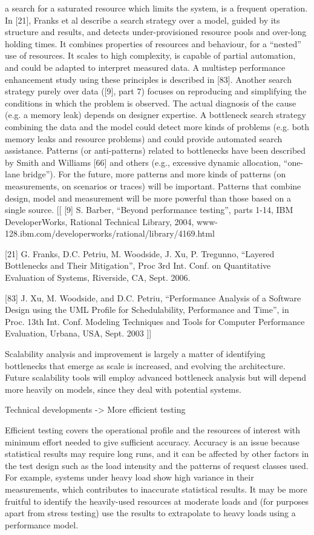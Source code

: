 \documentclass[runningheads,a4paper]{llncs}
\begin{document}
a search for a saturated resource which limits the system, is a frequent
operation. In [21], Franks et al describe a search strategy over a model, guided by its structure and
results, and detects under-provisioned resource pools and over-long holding
times. It combines properties of resources and behaviour, for a “nested” use of
resources. It scales to high complexity, is capable of partial automation, and
could be adapted to interpret measured data. A multistep performance enhancement
study using these principles is described in [83].
Another search strategy purely over data ([9], part 7) focuses on reproducing
and simplifying the conditions in which the problem is observed. The actual diagnosis
of the cause (e.g. a memory leak) depends on designer expertise.
A bottleneck search strategy combining the data and the model could detect more
kinds of problems (e.g. both memory leaks and resource problems) and could
provide automated search assistance.
Patterns (or anti-patterns) related to bottlenecks have been described by Smith
and Williams [66] and others (e.g., excessive dynamic allocation, “one-lane bridge”).
For the future, more patterns and more kinds of patterns (on measurements, on
scenarios or traces) will be important. Patterns that combine design, model and
measurement will be more powerful than those based on a single source.
[[
[9] S. Barber, “Beyond performance testing”, parts 1-14, IBM DeveloperWorks,
Rational Technical Library, 2004, www-128.ibm.com/developerworks/rational/library/4169.html

[21] G. Franks, D.C. Petriu, M. Woodside, J. Xu, P. Tregunno, “Layered
Bottlenecks and Their Mitigation”, Proc 3rd Int. Conf. on Quantitative Evaluation of Systems,
Riverside, CA, Sept. 2006.

[83] J. Xu, M. Woodside, and D.C. Petriu, “Performance Analysis of a Software
Design using the UML Profile for Schedulability, Performance and Time”, in Proc. 13th Int.
Conf. Modeling Techniques and Tools for Computer Performance Evaluation, Urbana,
USA, Sept. 2003 ]]

Scalability analysis and improvement is largely a matter of identifying
bottlenecks that emerge as scale is increased, and evolving the architecture. Future
scalability tools will employ advanced bottleneck analysis but will depend more
heavily on models, since they deal with potential systems.

Technical developments -> More efficient testing

Efficient testing covers the operational profile and the resources of interest
with minimum effort needed to give sufficient accuracy. Accuracy is an issue
because statistical results may require long runs, and it can be affected by
other factors in the test design such as the load intensity and the patterns of request classes
used. For example, systems under heavy load show high variance in their
measurements, which contributes to inaccurate statistical results. It may be more fruitful
to identify the heavily-used resources at moderate loads and (for purposes apart
from stress testing) use the results to extrapolate to heavy loads using a
performance model.
\end{document}
